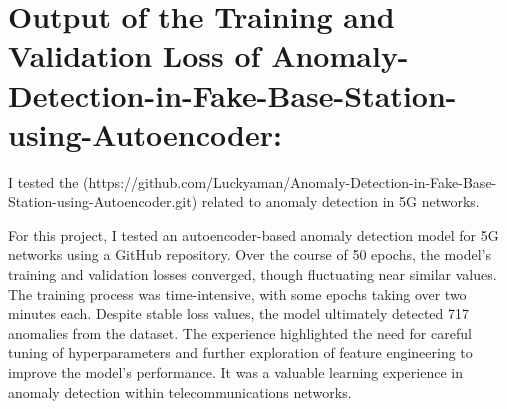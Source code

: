 \section*{Output of the Training and Validation Loss of Anomaly-Detection-in-Fake-Base-Station-using-Autoencoder: }

I tested the (https://github.com/Luckyaman/Anomaly-Detection-in-Fake-Base-Station-using-Autoencoder.git) related to anomaly detection in 5G networks.

For this project, I tested an autoencoder-based anomaly detection model for 5G networks using a GitHub repository. Over the course of 50 epochs, the model's training and validation losses converged, though fluctuating near similar values. The training process was time-intensive, with some epochs taking over two minutes each. Despite stable loss values, the model ultimately detected 717 anomalies from the dataset. The experience highlighted the need for careful tuning of hyperparameters and further exploration of feature engineering to improve the model’s performance. It was a valuable learning experience in anomaly detection within telecommunications networks.

